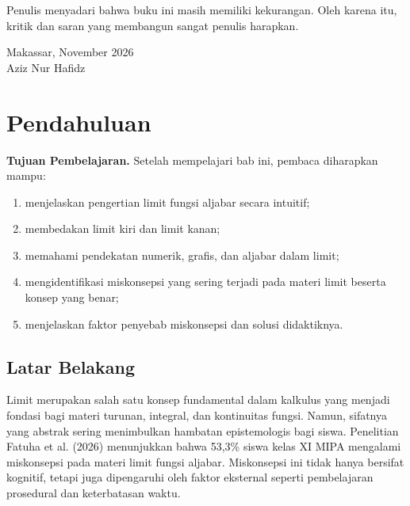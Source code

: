 \documentclass[12pt,a4paper,openany]{book}
\theoremstyle{definition}
\begin{document}
Penulis menyadari bahwa buku ini masih memiliki kekurangan. Oleh karena itu, kritik dan saran yang membangun sangat penulis harapkan.

\vspace{1cm}
\begin{flushright}
Makassar, November 2026\\
\vspace{0.5cm}
Aziz Nur Hafidz
\end{flushright}

\tableofcontents
\listoffigures
\listoftables

\mainmatter

\setcounter{chapter}{10} %

\chapter{Pendahuluan}

\textbf{Tujuan Pembelajaran.} Setelah mempelajari bab ini, pembaca diharapkan mampu:
\begin{enumerate}
  \item menjelaskan pengertian limit fungsi aljabar secara intuitif;
  \item membedakan limit kiri dan limit kanan;
  \item memahami pendekatan numerik, grafis, dan aljabar dalam limit;
  \item mengidentifikasi miskonsepsi yang sering terjadi pada materi limit beserta konsep yang benar;
  \item menjelaskan faktor penyebab miskonsepsi dan solusi didaktiknya.
\end{enumerate}

\section{Latar Belakang}

Limit merupakan salah satu konsep fundamental dalam kalkulus yang menjadi fondasi bagi materi turunan, integral, dan kontinuitas fungsi. Namun, sifatnya yang abstrak sering menimbulkan hambatan epistemologis bagi siswa. Penelitian Fatuha et al. (2026) menunjukkan bahwa 53,3\% siswa kelas XI MIPA mengalami miskonsepsi pada materi limit fungsi aljabar. Miskonsepsi ini tidak hanya bersifat kognitif, tetapi juga dipengaruhi oleh faktor eksternal seperti pembelajaran prosedural dan keterbatasan waktu.
\end{document}
